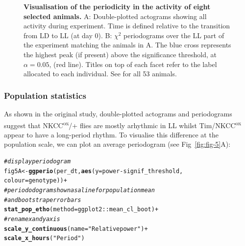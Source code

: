 \documentclass[10pt,letterpaper]{article}\usepackage[]{graphicx}\usepackage[]{color}
\makeatletter
\newcommand{\hlstr}[1]{\textcolor[rgb]{0.192,0.494,0.8}{#1}}%
\newcommand{\hlcom}[1]{\textcolor[rgb]{0.678,0.584,0.686}{\textit{#1}}}%
\newcommand{\hlopt}[1]{\textcolor[rgb]{0,0,0}{#1}}%
\newcommand{\hlstd}[1]{\textcolor[rgb]{0.345,0.345,0.345}{#1}}%
\newcommand{\hlkwb}[1]{\textcolor[rgb]{0.69,0.353,0.396}{#1}}%
\newcommand{\hlkwc}[1]{\textcolor[rgb]{0.333,0.667,0.333}{#1}}%
\newcommand{\hlkwd}[1]{\textcolor[rgb]{0.737,0.353,0.396}{\textbf{#1}}}%
\newenvironment{kframe}{%
 \def\at@end@of@kframe{}%
 \ifinner\ifhmode%
  \def\at@end@of@kframe{\end{minipage}}%
  \begin{minipage}{\columnwidth}%
 \fi\fi%
 \def\FrameCommand##1{\hskip\@totalleftmargin \hskip-\fboxsep
 \colorbox{shadecolor}{##1}\hskip-\fboxsep
     \hskip-\linewidth \hskip-\@totalleftmargin \hskip\columnwidth}%
 \MakeFramed {\advance\hsize-\width
   \@totalleftmargin\z@ \linewidth\hsize
   \@setminipage}}%
 {\par\unskip\endMakeFramed%
 \at@end@of@kframe}
\newenvironment{knitrout}{}{} %
\makeatother
\begin{document}
\begin{figure}[!h]
	\caption{{\bf Visualisation of the periodicity in the activity of eight selected animals.}
		A: Double-plotted actograms showing all activity during experiment.
		Time is defined relative to the transition from LD to LL (at day 0).
		B: $\chi{}^2$ periodograms over the LL part of the experiment matching the animals in A.
		The blue cross represents the highest peak (if present) above the significance threshold, at $\alpha = 0.05$, (red line).
		Titles on top of each facet refer to the label allocated to each individual.
		See  for all 53 animals.
	}
	\label{fig:fig-4}
\end{figure}

\subsubsection*{Population statistics}

As shown in the original study\cite{buhl_quasimodo_2016}, double-plotted actograms and periodograms suggest that NKCC\textsuperscript{ox}/+ flies are mostly 
arhythmic in LL whilst Tim/NKCC\textsuperscript{ox} appear to have a long-period rhythm.
To visualise this difference at the population scale, we can plot an average periodogram (see Fig~\ref{fig:fig-5}A):

\begin{knitrout}
\color{fgcolor}\begin{kframe}
\begin{alltt}
\hlcom{# display periodogram }
\hlstd{fig5A} \hlkwb{<-} \hlkwd{ggperio}\hlstd{(per_dt,} \hlkwd{aes}\hlstd{(}\hlkwc{y} \hlstd{= power} \hlopt{-} \hlstd{signif_threshold,}
                             \hlkwc{colour} \hlstd{= genotype))} \hlopt{+}
          \hlcom{# periododogram shown as a line for population mean}
          \hlcom{# and bootstrap error bars}
          \hlkwd{stat_pop_etho}\hlstd{(}\hlkwc{method} \hlstd{= ggplot2}\hlopt{::}\hlstd{mean_cl_boot)} \hlopt{+}
          \hlcom{# rename x and y axis }
          \hlkwd{scale_y_continuous}\hlstd{(}\hlkwc{name} \hlstd{=} \hlstr{"Relative power"}\hlstd{)} \hlopt{+}
          \hlkwd{scale_x_hours}\hlstd{(}\hlstr{"Period"}\hlstd{)}
\end{alltt}
\end{kframe}
\end{knitrout}
\end{document}
